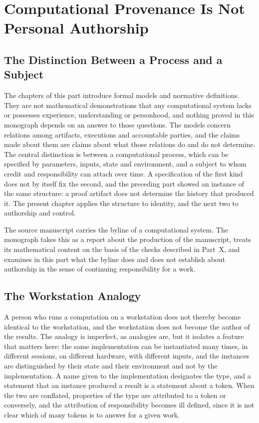 \documentclass[11pt,letterpaper]{report}
\theoremstyle{plain}
\theoremstyle{definition}
\theoremstyle{remark}
\begin{document}
\chapter{Computational Provenance Is Not Personal Authorship}

\section{The Distinction Between a Process and a Subject}

The chapters of this part introduce formal models and normative definitions. They are not mathematical demonstrations that any computational system lacks or possesses experience, understanding or personhood, and nothing proved in this monograph depends on an answer to those questions. The models concern relations among artifacts, executions and accountable parties, and the claims made about them are claims about what those relations do and do not determine. The central distinction is between a computational process, which can be specified by parameters, inputs, state and environment, and a subject to whom credit and responsibility can attach over time. A specification of the first kind does not by itself fix the second, and the preceding part showed an instance of the same structure: a proof artifact does not determine the history that produced it. The present chapter applies the structure to identity, and the next two to authorship and control.

The source manuscript carries the byline of a computational system. The monograph takes this as a report about the production of the manuscript, treats its mathematical content on the basis of the checks described in Part~X, and examines in this part what the byline does and does not establish about authorship in the sense of continuing responsibility for a work.

\section{The Workstation Analogy}

A person who runs a computation on a workstation does not thereby become identical to the workstation, and the workstation does not become the author of the results. The analogy is imperfect, as analogies are, but it isolates a feature that matters here: the same implementation can be instantiated many times, in different sessions, on different hardware, with different inputs, and the instances are distinguished by their state and their environment and not by the implementation. A name given to the implementation designates the type, and a statement that an instance produced a result is a statement about a token. When the two are conflated, properties of the type are attributed to a token or conversely, and the attribution of responsibility becomes ill defined, since it is not clear which of many tokens is to answer for a given work.
\end{document}
